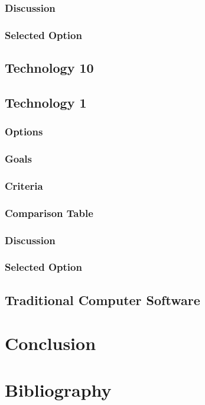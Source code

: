 \documentclass[10pt,draftclsnofoot,onecolumn]{IEEEtran}
\begin{document}
\subsubsection{Discussion}
\subsubsection{Selected Option}
\subsection{Technology 10}
\subsection{Technology 1}
\subsubsection{Options}
\subsubsection{Goals}
\subsubsection{Criteria}
\subsubsection{Comparison Table}
\subsubsection{Discussion}
\subsubsection{Selected Option}
\subsection{Traditional Computer Software}

\section{Conclusion}
\section{Bibliography}
\end{document}
